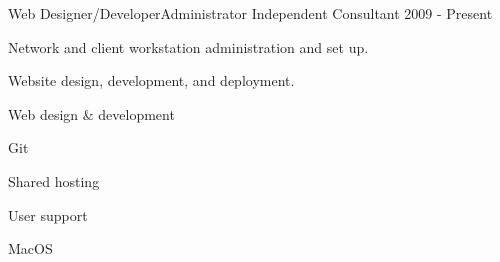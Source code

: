 \begin{cventries}
  \cventry
    {Web Designer/Developer{\enskip\cdotp\enskip}Administrator} %
    {Independent Consultant} %
    {} %
    {2009 - Present} %
    {
      \begin{cvitems} %
        \item {Network and client workstation administration and set up.}
        \item {Website design, development, and deployment.}
      \end{cvitems}
    }
    \begin{cventryskills}
      \item Web design \& development
      \item Git
      \item Shared hosting
      \item User support
      \item MacOS
    \end{cventryskills}

\end{cventries}
